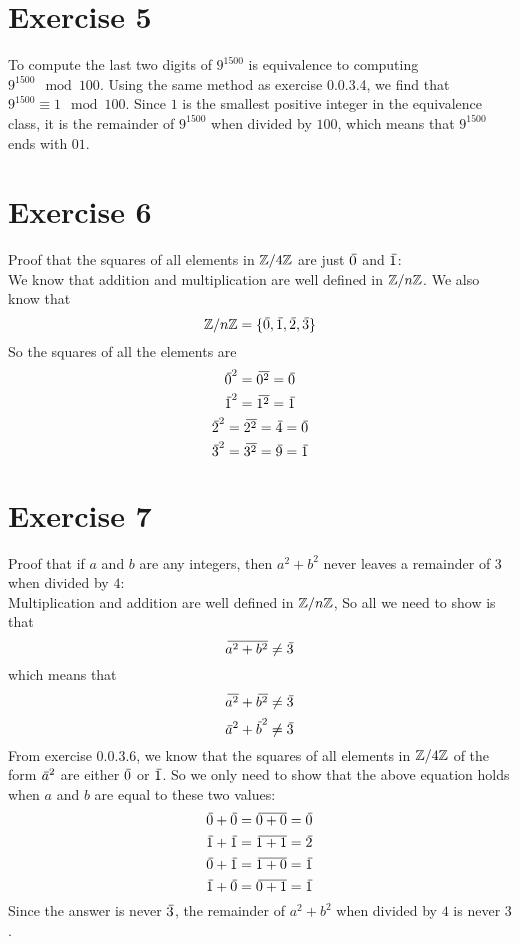 \documentclass[12pt]{article}
\begin{document}
    \section*{Exercise 5}
    To compute the last two digits of $9^{1500}$
    is equivalence to computing $9^{1500} \mod 100$.
    Using the same method as exercise 0.0.3.4,
    we find that $9^{1500} \equiv 1 \mod 100$.
    Since $1$ is the smallest positive integer
    in the equivalence class,
    it is the remainder of $9^{1500}$ when divided by $100$,
    which means that $9^{1500}$ ends with $01$. \\

    \section*{Exercise 6}
    Proof that the squares of all elements in $\mathbb{Z}/4\mathbb{Z}$
    are just $\,\overline{\!{0}}$ and $\,\overline{\!{1}}$: \\
    We know that addition and multiplication are well defined
    in $\mathbb{Z}/n\mathbb{Z}$.
    We also know that
    \[\mathbb{Z}/n\mathbb{Z} = \{ \,\overline{\!{0}}, \,\overline{\!{1}}, \,\overline{\!{2}}, \,\overline{\!{3}} \}\]
    So the squares of all the elements are
    \[ \,\overline{\!{0}}^2 = \,\overline{\!{0^2}} = \,\overline{\!{0}} \]
    \[ \,\overline{\!{1}}^2 = \,\overline{\!{1^2}} = \,\overline{\!{1}} \]
    \[ \,\overline{\!{2}}^2 = \,\overline{\!{2^2}} = \,\overline{\!{4}} = \,\overline{\!{0}} \]
    \[ \,\overline{\!{3}}^2 = \,\overline{\!{3^2}} = \,\overline{\!{9}} = \,\overline{\!{1}} \]

    \section*{Exercise 7}
    Proof that if $a$ and $b$ are any integers,
    then $a^2 + b^2$ never leaves a remainder of $3$
    when divided by $4$: \\
    Multiplication and addition are well defined in $\mathbb{Z}/n\mathbb{Z}$,
    So all we need to show is that
    \[ \,\overline{\!{a^2 + b^2}} \neq \,\overline{\!{3}} \]
    which means that 
    \[ \,\overline{\!{a^2}} + \,\overline{\!{b^2}} \neq \,\overline{\!{3}} \]
    \[ \,\overline{\!{a}}^2 + \,\overline{\!{b}}^2 \neq \,\overline{\!{3}} \]
    From exercise 0.0.3.6,
    we know that the squares of all elements in $\mathbb{Z}/4\mathbb{Z}$
    of the form $\,\overline{\!{a}}^2$
    are either $\,\overline{\!{0}}$ or $\,\overline{\!{1}}$.
    So we only need to show that the above equation
    holds when $a$ and $b$ are equal to these two values:
    \[ \,\overline{\!{0}} + \,\overline{\!{0}} = \,\overline{\!{0 + 0}} = \,\overline{\!{0}} \]
    \[ \,\overline{\!{1}} + \,\overline{\!{1}} = \,\overline{\!{1 + 1}} = \,\overline{\!{2}} \]
    \[ \,\overline{\!{0}} + \,\overline{\!{1}} = \,\overline{\!{1 + 0}} = \,\overline{\!{1}} \]
    \[ \,\overline{\!{1}} + \,\overline{\!{0}} = \,\overline{\!{0 + 1}} = \,\overline{\!{1}} \]
    Since the answer is never $\,\overline{\!{3}}$,
    the remainder of $a^2 + b^2$ when divided by $4$
    is never $3$. \\
\end{document}
